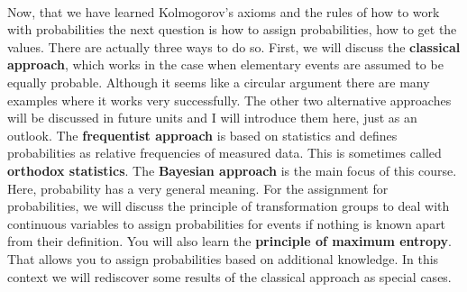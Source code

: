 \documentclass[12pt, a4paper]{scrartcl}
\begin{document}
\\

Now, that we have learned Kolmogorov’s axioms and the rules of how to work with probabilities the next question is how to assign probabilities, how to get the values.
There are actually three ways to do so. First, we will discuss the \textbf{classical approach}, which works in the case when elementary events are assumed to be equally probable. Although it seems like a circular argument there are many examples where it works very successfully.
The other two alternative approaches will be discussed in future units and I will introduce them here, just as an outlook. The \textbf{frequentist approach} is based on statistics and defines probabilities as relative frequencies of measured data. This is sometimes called \textbf{orthodox statistics}.
The \textbf{Bayesian approach} is the main focus of this course. Here, probability has a very general meaning. For the assignment for probabilities, we will discuss the principle of transformation groups to deal with continuous variables to assign probabilities for events if nothing is known apart from their definition. You will also learn the \textbf{principle of maximum entropy}. That allows you to assign probabilities based on additional knowledge. In this context we will rediscover some results of the classical approach as special cases. \\
\end{document}
